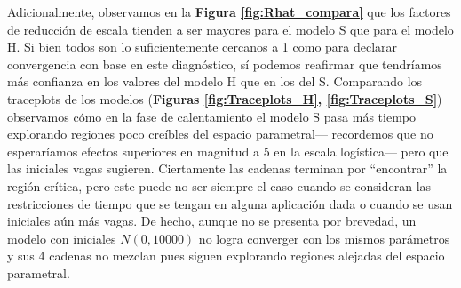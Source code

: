  Adicionalmente, observamos en la \textbf{Figura \ref{fig:Rhat_compara}} que los factores de reducción de escala tienden a ser mayores para el modelo S que para el modelo H. Si bien todos son lo suficientemente cercanos a 1 como para declarar convergencia con base en este diagnóstico, sí podemos reafirmar que tendríamos más confianza en los valores del modelo H que en los del S. Comparando los traceplots de los modelos (\textbf{Figuras  \ref{fig:Traceplots_H}, \ref{fig:Traceplots_S}}) observamos cómo en la fase de calentamiento el modelo S pasa más tiempo explorando regiones poco creíbles del espacio parametral--- recordemos que no esperaríamos efectos superiores en magnitud a 5 en la escala logística--- pero que las iniciales vagas sugieren. Ciertamente las cadenas terminan por ``encontrar'' la región crítica, pero este puede no ser siempre el caso cuando se consideran las restricciones de tiempo que se tengan en alguna aplicación dada o cuando se usan iniciales aún más vagas. De hecho, aunque no se presenta por brevedad, un modelo con iniciales $N(0,10000)$ no logra converger con los mismos parámetros y sus 4 cadenas no mezclan pues siguen explorando regiones alejadas del espacio parametral.\\ 

